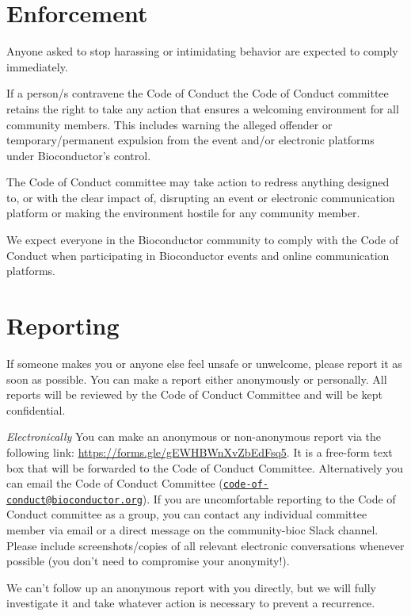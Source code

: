 \documentclass[
  oneside]{book}
\begin{document}
\hypertarget{enforcement}{%
\section{Enforcement}\label{enforcement}}

Anyone asked to stop harassing or intimidating behavior are expected to comply immediately.

If a person/s contravene the Code of Conduct the Code of Conduct committee retains the right to take any action that ensures a welcoming environment for all community members. This includes warning the alleged offender or temporary/permanent expulsion from the event and/or electronic platforms under Bioconductor's control.

The Code of Conduct committee may take action to redress anything designed to, or with the clear impact of, disrupting an event or electronic communication platform or making the environment hostile for any community member.

We expect everyone in the Bioconductor community to comply with the Code of Conduct when participating in Bioconductor events and online communication platforms.

\hypertarget{reporting}{%
\section{Reporting}\label{reporting}}

If someone makes you or anyone else feel unsafe or unwelcome, please report it as soon as possible. You can make a report either anonymously or personally. All reports will be reviewed by the Code of Conduct Committee and will be kept confidential.

\emph{Electronically}
You can make an anonymous or non-anonymous report via the following link: \url{https://forms.gle/gEWHBWnXvZbEdFsq5}. It is a free-form text box that will be forwarded to the Code of Conduct Committee. Alternatively you can email the Code of Conduct Committee (\href{mailto:code-of-conduct@bioconductor.org}{\nolinkurl{code-of-conduct@bioconductor.org}}). If you are uncomfortable reporting to the Code of Conduct committee as a group, you can contact any individual committee member via email or a direct message on the community-bioc Slack channel. Please include screenshots/copies of all relevant electronic conversations whenever possible (you don't need to compromise your anonymity!).

We can't follow up an anonymous report with you directly, but we will fully investigate it and take whatever action is necessary to prevent a recurrence.
\end{document}
